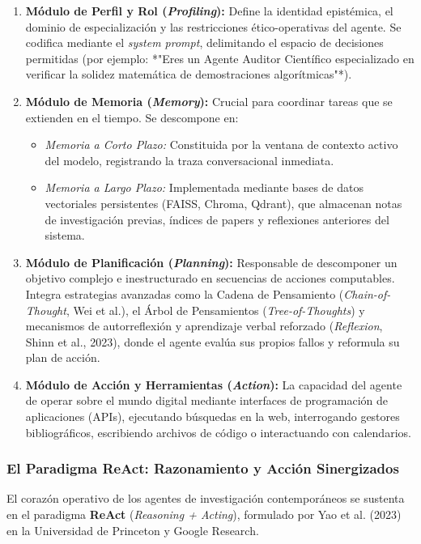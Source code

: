 \begin{enumerate}
    \item \textbf{Módulo de Perfil y Rol (\textit{Profiling}):} Define la identidad epistémica, el dominio de especialización y las restricciones ético-operativas del agente. Se codifica mediante el \textit{system prompt}, delimitando el espacio de decisiones permitidas (por ejemplo: *"Eres un Agente Auditor Científico especializado en verificar la solidez matemática de demostraciones algorítmicas"*).
    \item \textbf{Módulo de Memoria (\textit{Memory}):} Crucial para coordinar tareas que se extienden en el tiempo. Se descompone en:
    \begin{itemize}
        \item \textit{Memoria a Corto Plazo:} Constituida por la ventana de contexto activo del modelo, registrando la traza conversacional inmediata.
        \item \textit{Memoria a Largo Plazo:} Implementada mediante bases de datos vectoriales persistentes (FAISS, Chroma, Qdrant), que almacenan notas de investigación previas, índices de papers y reflexiones anteriores del sistema.
    \end{itemize}
    \item \textbf{Módulo de Planificación (\textit{Planning}):} Responsable de descomponer un objetivo complejo e inestructurado en secuencias de acciones computables. Integra estrategias avanzadas como la Cadena de Pensamiento (\textit{Chain-of-Thought}, Wei et al.), el Árbol de Pensamientos (\textit{Tree-of-Thoughts}) y mecanismos de autorreflexión y aprendizaje verbal reforzado (\textit{Reflexion}, Shinn et al., 2023), donde el agente evalúa sus propios fallos y reformula su plan de acción.
    \item \textbf{Módulo de Acción y Herramientas (\textit{Action}):} La capacidad del agente de operar sobre el mundo digital mediante interfaces de programación de aplicaciones (APIs), ejecutando búsquedas en la web, interrogando gestores bibliográficos, escribiendo archivos de código o interactuando con calendarios.
\end{enumerate}

\subsubsection{El Paradigma ReAct: Razonamiento y Acción Sinergizados}

El corazón operativo de los agentes de investigación contemporáneos se sustenta en el paradigma \textbf{ReAct} (\textit{Reasoning + Acting}), formulado por Yao et al. (2023) en la Universidad de Princeton y Google Research.

